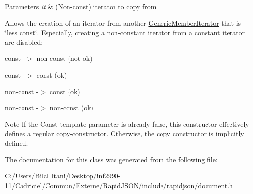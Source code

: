 \begin{DoxyParams}{Parameters}
{\em it} & (Non-\/const) iterator to copy from\\
\hline
\end{DoxyParams}
Allows the creation of an iterator from another \hyperlink{class_generic_member_iterator}{Generic\+Member\+Iterator} that is \char`\"{}less const\char`\"{}. Especially, creating a non-\/constant iterator from a constant iterator are disabled\+: \begin{DoxyItemize}
\item const -\/$>$ non-\/const (not ok) \item const -\/$>$ const (ok) \item non-\/const -\/$>$ const (ok) \item non-\/const -\/$>$ non-\/const (ok)\end{DoxyItemize}
\begin{DoxyNote}{Note}
If the {\ttfamily Const} template parameter is already {\ttfamily false}, this constructor effectively defines a regular copy-\/constructor. Otherwise, the copy constructor is implicitly defined. 
\end{DoxyNote}


The documentation for this class was generated from the following file\+:\begin{DoxyCompactItemize}
\item 
C\+:/\+Users/\+Bilal Itani/\+Desktop/inf2990-\/11/\+Cadriciel/\+Commun/\+Externe/\+Rapid\+J\+S\+O\+N/include/rapidjson/\hyperlink{document_8h}{document.\+h}\end{DoxyCompactItemize}

